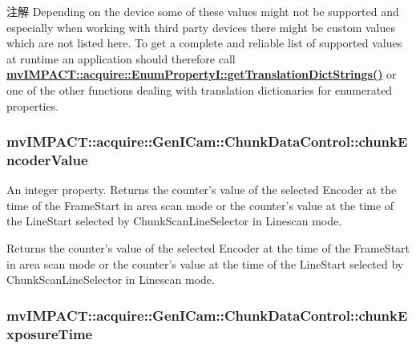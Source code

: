 \begin{DoxyNote}{注解}
Depending on the device some of these values might not be supported and especially when working with third party devices there might be custom values which are not listed here. To get a complete and reliable list of supported values at runtime an application should therefore call {\bfseries \hyperlink{classmv_i_m_p_a_c_t_1_1acquire_1_1_enum_property_i_a0ba6ccbf5ee69784d5d0b537924d26b6}{mv\+I\+M\+P\+A\+C\+T\+::acquire\+::\+Enum\+Property\+I\+::get\+Translation\+Dict\+Strings()}} or one of the other functions dealing with translation dictionaries for enumerated properties. 
\end{DoxyNote}
\hypertarget{classmv_i_m_p_a_c_t_1_1acquire_1_1_gen_i_cam_1_1_chunk_data_control_a9483a862178c537ba676b62bd51a5711}{
\subsubsection[{chunk\+Encoder\+Value}]{ mv\+I\+M\+P\+A\+C\+T\+::acquire\+::\+Gen\+I\+Cam\+::\+Chunk\+Data\+Control\+::chunk\+Encoder\+Value}}\label{classmv_i_m_p_a_c_t_1_1acquire_1_1_gen_i_cam_1_1_chunk_data_control_a9483a862178c537ba676b62bd51a5711}


An integer property. Returns the counter's value of the selected Encoder at the time of the Frame\+Start in area scan mode or the counter's value at the time of the Line\+Start selected by Chunk\+Scan\+Line\+Selector in Linescan mode. 

Returns the counter's value of the selected Encoder at the time of the Frame\+Start in area scan mode or the counter's value at the time of the Line\+Start selected by Chunk\+Scan\+Line\+Selector in Linescan mode. \hypertarget{classmv_i_m_p_a_c_t_1_1acquire_1_1_gen_i_cam_1_1_chunk_data_control_a111bfcd0b354e55b9a54ffbb1a9d5299}{
\subsubsection[{chunk\+Exposure\+Time}]{ mv\+I\+M\+P\+A\+C\+T\+::acquire\+::\+Gen\+I\+Cam\+::\+Chunk\+Data\+Control\+::chunk\+Exposure\+Time}}\label{classmv_i_m_p_a_c_t_1_1acquire_1_1_gen_i_cam_1_1_chunk_data_control_a111bfcd0b354e55b9a54ffbb1a9d5299}


